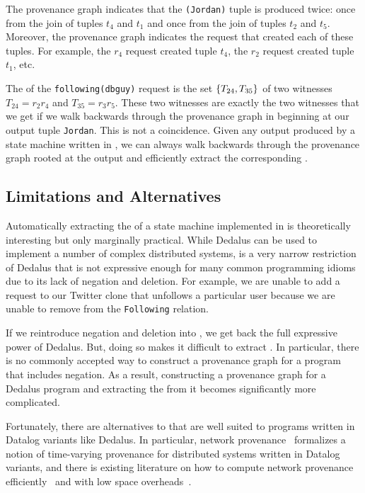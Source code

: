 The provenance graph indicates that the \texttt{(Jordan)} tuple is produced
twice: once from the join of tuples $t_4$ and $t_1$ and once from the join of
tuples $t_2$ and $t_5$. Moreover, the provenance graph indicates the request
that created each of these tuples. For example, the $r_4$ request created tuple
$t_4$, the $r_2$ request created tuple $t_1$, etc.

The \watprovenance{} of the \texttt{following(dbguy)} request is the set
$\{T_{24}, T_{35}\}$ of two witnesses $T_{24} = r_2r_4$ and $T_{35} =
r_3r_5$. These two witnesses are exactly the two witnesses that we get if we
walk backwards through the provenance graph in 
beginning at our output tuple \texttt{Jordan}. This is not a coincidence. Given
any output produced by a state machine written in \dedalusplus{}, we can always
walk backwards through the provenance graph rooted at the output and
efficiently extract the corresponding \watprovenance{}.

\subsection{Limitations and Alternatives}
Automatically extracting the \watprovenance{} of a state machine implemented in
\dedalusplus{} is theoretically interesting but only marginally practical.
While Dedalus can be used to implement a number of complex distributed systems,
\dedalusplus{} is a very narrow restriction of Dedalus that is not expressive
enough for many common programming idioms due to its lack of negation and
deletion. For example, we are unable to add a request to our \dedalusplus{}
Twitter clone that unfollows a particular user because we are unable to remove
from the \texttt{Following} relation.

If we reintroduce negation and deletion into \dedalusplus{}, we get back the
full expressive power of Dedalus. But, doing so makes it difficult to extract
\watprovenance{}. In particular, there is no commonly accepted way to construct
a provenance graph for a program that includes negation. As a result,
constructing a provenance graph for a Dedalus program and extracting the
\watprovenance{} from it becomes significantly more complicated.

Fortunately, there are alternatives to \watprovenance{} that are well suited to
programs written in Datalog variants like Dedalus. In particular, network
provenance~\cite{zhou2010efficient, zhou2011secure, zhou2012distributed}
formalizes a notion of time-varying provenance for distributed systems written
in Datalog variants, and there is existing literature on how to compute network
provenance efficiently~\cite{zhou2010efficient, zhou2012distributed} and with
low space overheads~\cite{chen2017distributed}.

